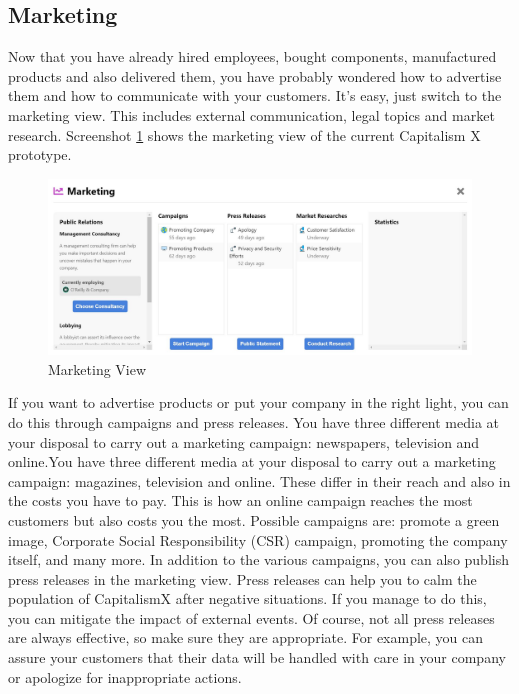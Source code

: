 \subsection{Marketing} \label{marketing_manual}

Now that you have already hired employees, bought components, manufactured products and also delivered them, you have probably wondered how to advertise them and how to communicate with your customers. It's easy, just switch to the marketing view. This includes external communication, legal topics and market research.
Screenshot \ref{fig:marketing_view} shows the marketing view of the current Capitalism X prototype.

\begin{figure}
    \centering
    \includegraphics [width=\textwidth]{images/marketing_view.JPG}
    \caption{Marketing View}
    \label{fig:marketing_view}
\end{figure}

If you want to advertise products or put your company in the right light, you can do this through campaigns and press releases. You have three different media at your disposal to carry out a marketing campaign: newspapers, television and online.You have three different media at your disposal to carry out a marketing campaign: magazines, television and online. These differ in their reach and also in the costs you have to pay. This is how an online campaign reaches the most customers but also costs you the most. Possible campaigns are: promote a green image, Corporate Social Responsibility (\gls{CSR}) campaign, promoting the company itself, and many more.
In addition to the various campaigns, you can also publish press releases in the marketing view. Press releases can help you to calm the population of CapitalismX after negative situations. If you manage to do this, you can mitigate the impact of external events. Of course, not all press releases are always effective, so make sure they are appropriate. 
For example, you can assure your customers that their data will be handled with care in your company or apologize for inappropriate actions.

